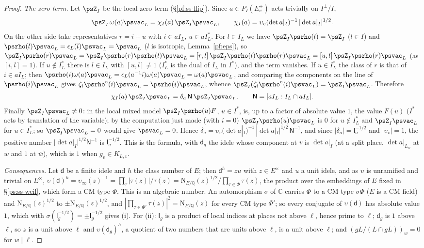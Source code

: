 \documentclass[10pt]{amsart}
\theoremstyle{definition}
\theoremstyle{remark}
\newcommand{\C}{\mathbb C}
\newcommand{\Q}{\mathbb Q}
\providecommand{\aubar}[1]{\overline{#1}}
\begin{document}
\begin{proof}
\emph{The zero term.} Let $\psZ_I$ be the local zero term (\S\ref{pf:ss-flip}). Since $a\in P_I(E^+_v)$
acts trivially on $I^\perp/I$,
\[
\psZ_I\,\omega(a)\psvac_L=\chi_I(a)\,\psZ_I\psvac_L,\qquad\chi_I(a)=\upsilon_v(\det a|_I)^{-1}\,|\det a|_I|^{1/2}.
\]
On the other side take representatives $r=i+u$ with $i\in aI_L$, $u\in aI_L^*$. For $l\in I_L$ we have
$\psZ_I\psrho(l)=\psZ_I$ ($l\in I$) and $\psrho(l)\psvac_L=\epsilon_L(l)\psvac_L=\psvac_L$ ($l$ is isotropic,
Lemma~\ref{pf:eps}), so $\psZ_I\psrho(r)\psvac_L=\psZ_I\psrho(r)\psrho(l)\psvac_L=[r,l]\,\psZ_I\psrho(l)
\psrho(r)\psvac_L=[u,l]\,\psZ_I\psrho(r)\psvac_L$ (as $[i,l]=1$). If $u\notin I_L^*$ there is $l\in I_L$ with
$[u,l]\ne1$ ($I_L^*$ is the dual of $I_L$ in $I^*$), and the term vanishes. If $u\in I_L^*$ the class of
$r$ is that of $i\in aI_L$; then $\psrho(i)\omega(a)\psvac_L=\epsilon_L(a^{-1}i)\omega(a)\psvac_L=\omega(a)
\psvac_L$, and comparing the components on the line of $\psrho(i)\psvac_L$ gives $\zeta_i\psrho^\circ(i)
\psvac_L=\psrho(i)\psvac_L$, whence $\psZ_I(\zeta_i\psrho^\circ(i)\psvac_L)=\psZ_I\psvac_L$. Therefore
\[
\chi_I(a)\,\psZ_I\psvac_L=\delta_a\,\mathsf N\,\psZ_I\psvac_L,\qquad\mathsf N=[aI_L:I_L\cap aI_L].
\]
Finally $\psZ_I\psvac_L\ne0$: in the local mixed model $\psZ_I\psrho(u)F$, $u\in I^*$, is, up to a factor of absolute value $1$, the value $F(u)$ ($I^*$ acts by translation of the variable); by the computation just made (with $i=0$) $\psZ_I\psrho(u)\psvac_L$ is $0$ for
$u\notin I_L^*$ and $\psZ_I\psvac_L$ for $u\in I_L^*$; so $\psZ_I\psvac_L=0$ would give $\psvac_L=0$. Hence
$\delta_a=\upsilon_v(\det a|_I)^{-1}\,|\det a|_I|^{1/2}\,\mathsf N^{-1}$, and since $|\delta_a|=\mathsf I_a^{-1/2}$ and $|\upsilon_v|=1$, the
positive number $|\det a|_I|^{1/2}\mathsf N^{-1}$ is $\mathsf I_a^{-1/2}$. This is the formula, with
$\mathsf d_g$ the idele whose component at $v$ is $\det a|_I$ (at a split place, $\det a|_{L_w}$ at $w$ and
$1$ at $\aubar w$), which is $1$ when $g_v\in K_{L,v}$.

\emph{Consequences.} Let $\mathsf d$ be a finite idele and $h$ the class number of $E$; then
$\mathsf d^h=zu$ with $z\in E^\times$ and $u$ a unit idele, and as $\upsilon$ is unramified and trivial on
$E^\times$, $\upsilon(\mathsf d)^h=\upsilon_\infty(z)^{-1}=\prod_{\tau}|\tau(z)|/\tau(z)=\mathrm N_{E/\Q}(z)^{1/2}\big/\prod_{\tau\in\Phi}\tau(z)$, the product over the
embeddings of $E$ fixed in \S\ref{ps:ss-weil}, which form a CM type $\Phi$. This is an algebraic number. An automorphism $\sigma$ of $\C$ carries $\Phi$
to a CM type $\sigma\Phi$ ($E$ is a CM field) and $\mathrm N_{E/\Q}(z)^{1/2}$ to $\pm\mathrm N_{E/\Q}(z)^{1/2}$,
and $|\prod_{\tau\in\Phi'}\tau(z)|^2=\mathrm N_{E/\Q}(z)$ for every CM type $\Phi'$; so every conjugate of $\upsilon(\mathsf d)$ has absolute
value $1$, which with $\sigma(\mathsf I_g^{-1/2})=\pm\mathsf I_g^{-1/2}$ gives (i). For (ii): $\mathsf I_g$ is a
product of local indices at places not above $\ell$, hence prime to $\ell$; $\mathsf d_g$ is $1$ above
$\ell$, so $z$ is a unit above $\ell$ and $\upsilon(\mathsf d_g)^h$, a quotient of two numbers that are
units above $\ell$, is a unit above $\ell$; and $(gL/(L\cap gL))_w=0$ for $w\mid\ell$.
\end{proof}
\end{document}
